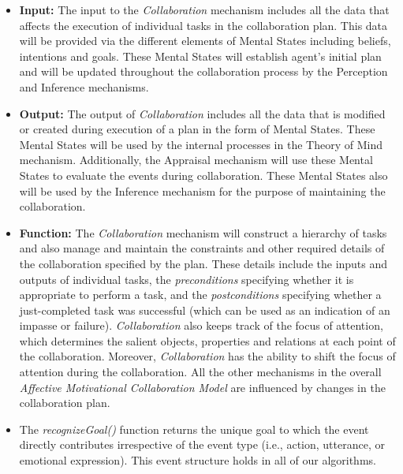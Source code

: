 \documentclass[letterpaper]{article}
\begin{document}
\begin{itemize}
  \item \textbf{Input:} The input to the \textit{Collaboration} mechanism
  includes all the data that affects the execution of individual tasks in the
  collaboration plan. This data will be provided via the different elements of
  Mental States including beliefs, intentions and goals. These Mental States
  will establish agent's initial plan and will be updated throughout the
  collaboration process by the Perception and Inference mechanisms.
  
  \item \textbf{Output:} The output of \textit{Collaboration} includes all the
  data that is modified or created during execution of a plan in the form of
  Mental States. These Mental States will be used by the internal processes in
  the Theory of Mind mechanism. Additionally, the Appraisal mechanism will use
  these Mental States to evaluate the events during collaboration. These Mental
  States also will be used by the Inference mechanism for the purpose of
  maintaining the collaboration.
  
  \item \textbf{Function:} The \textit{Collaboration} mechanism will construct a
  hierarchy of tasks and also manage and maintain the constraints and other
  required details of the collaboration specified by the plan. These details
  include the inputs and outputs of individual tasks, the \textit{preconditions}
  specifying whether it is appropriate to perform a task, and the
  \textit{postconditions} specifying whether a just-completed task was
  successful (which can be used as an indication of an impasse or failure).
  \textit{Collaboration} also keeps track of the focus of attention, which
  determines the salient objects, properties and relations at each point of the
  collaboration. Moreover, \textit{Collaboration} has the ability to shift the
  focus of attention during the collaboration. All the other mechanisms in the
  overall \textit{Affective Motivational Collaboration Model} are influenced by
  changes in the collaboration plan.
\end{itemize}

\begin{itemize}
  \item The \textit{recognizeGoal()} function returns the unique goal to which
  the event directly contributes irrespective of the event type (i.e., action,
  utterance, or emotional expression). This event structure holds in all of our
  algorithms.
\end{itemize}
\end{document}
